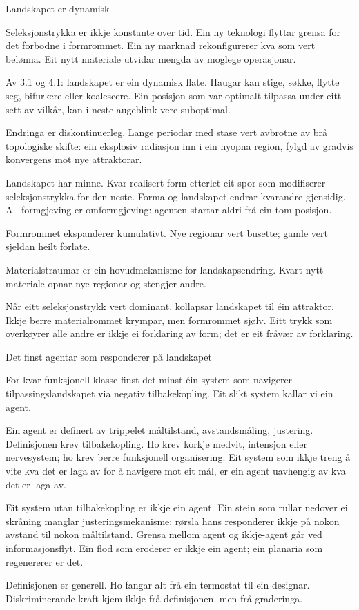 \documentclass[10pt,oneside]{book}
\newlength{\propnumwidth}
\newlength{\propnumgap}
\newcommand{\prop}[3]{%
  \par\addvspace{6pt}%
  \noindent\llap{\makebox[\propnumwidth][l]{\textbf{#1}\textsuperscript{\textit{#2}}}\hspace{\propnumgap}}%
  #3\par%
  \addvspace{2pt}%
}
\begin{document}
\prop{4}{}{Landskapet er dynamisk}
\prop{4.1}{a}{Seleksjonstrykka er ikkje konstante over tid. Ein ny teknologi flyttar grensa for det forbodne i formrommet. Ein ny marknad rekonfigurerer kva som vert belønna. Eit nytt materiale utvidar mengda av moglege operasjonar.}
\prop{4.2}{t}{Av 3.1 og 4.1: landskapet er ein dynamisk flate. Haugar kan stige, søkke, flytte seg, bifurkere eller koalescere. Ein posisjon som var optimalt tilpassa under eitt sett av vilkår, kan i neste augeblink vere suboptimal.}
\prop{4.3}{o}{Endringa er diskontinuerleg. Lange periodar med stase vert avbrotne av brå topologiske skifte: ein eksplosiv radiasjon inn i ein nyopna region, fylgd av gradvis konvergens mot nye attraktorar.}
\prop{4.4}{o}{Landskapet har minne. Kvar realisert form etterlet eit spor som modifiserer seleksjonstrykka for den neste. Forma og landskapet endrar kvarandre gjensidig. All formgjeving er omformgjeving: agenten startar aldri frå ein tom posisjon.}
\prop{4.5}{o}{Formrommet ekspanderer kumulativt. Nye regionar vert busette; gamle vert sjeldan heilt forlate.}
\prop{4.6}{o}{Materialstraumar er ein hovudmekanisme for landskapsendring. Kvart nytt materiale opnar nye regionar og stengjer andre.}
\prop{4.7}{i}{Når eitt seleksjonstrykk vert dominant, kollapsar landskapet til éin attraktor. Ikkje berre materialrommet krympar, men formrommet sjølv. Eitt trykk som overkøyrer alle andre er ikkje ei forklaring av form; det er eit fråvær av forklaring.}
\clearpage
{}
\prop{5}{}{Det finst agentar som responderer på landskapet}
\prop{5.1}{a}{For kvar funksjonell klasse finst det minst éin system som navigerer tilpassingslandskapet via negativ tilbakekopling. Eit slikt system kallar vi ein agent.}
\prop{5.2}{d}{Ein agent er definert av trippelet måltilstand, avstandsmåling, justering. Definisjonen krev tilbakekopling. Ho krev korkje medvit, intensjon eller nervesystem; ho krev berre funksjonell organisering. Eit system som ikkje treng å vite kva det er laga av for å navigere mot eit mål, er ein agent uavhengig av kva det er laga av.}
\prop{5.21}{t}{Eit system utan tilbakekopling er ikkje ein agent. Ein stein som rullar nedover ei skråning manglar justeringsmekanisme: rørsla hans responderer ikkje på nokon avstand til nokon måltilstand. Grensa mellom agent og ikkje-agent går ved informasjonsflyt. Ein flod som eroderer er ikkje ein agent; ein planaria som regenererer er det.}
\prop{5.22}{t}{Definisjonen er generell. Ho fangar alt frå ein termostat til ein designar. Diskriminerande kraft kjem ikkje frå definisjonen, men frå graderinga.}
\end{document}
